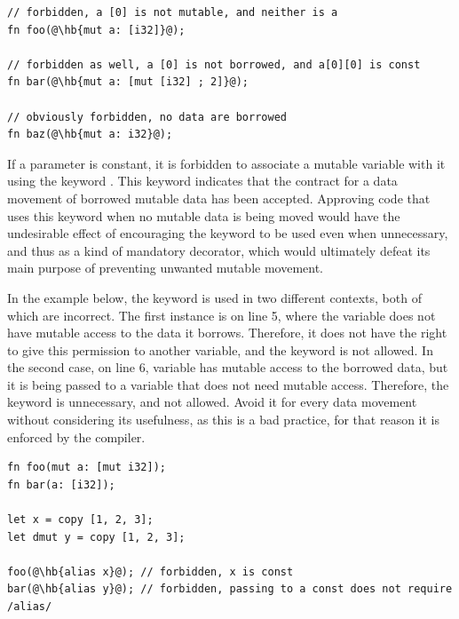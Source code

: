 \begin{lstlisting}[style=coloredverbatimError, escapechar=@]
// forbidden, a [0] is not mutable, and neither is a
fn foo(@\hb{mut a: [i32]}@);

// forbidden as well, a [0] is not borrowed, and a[0][0] is const
fn bar(@\hb{mut a: [mut [i32] ; 2]}@);

// obviously forbidden, no data are borrowed
fn baz(@\hb{mut a: i32}@);
\end{lstlisting}

If a parameter is constant, it is forbidden to associate a mutable variable with
it using the keyword . This keyword indicates that the
contract for a data movement of borrowed mutable data has been accepted.
Approving code that uses this keyword when no mutable data is being moved would
have the undesirable effect of encouraging the keyword to be used even when
unnecessary, and thus as a kind of mandatory decorator, which would ultimately
defeat its main purpose of preventing unwanted mutable movement.

In the example below, the keyword  is used in two different
contexts, both of which are incorrect. The first instance is on line 5, where
the variable  does not have mutable access to the data it borrows.
Therefore, it does not have the right to give this permission to another
variable, and the keyword  is not allowed. In the second case, on
line 6, variable  has mutable access to the borrowed data, but it is
being passed to a variable that does not need mutable access. Therefore, the
keyword is unnecessary, and not allowed. Avoid it for
every data movement without considering its usefulness, as this is a bad
practice, for that reason it is enforced by the compiler.

\begin{lstlisting}[style=coloredverbatimError, escapechar=@]
fn foo(mut a: [mut i32]);
fn bar(a: [i32]);

let x = copy [1, 2, 3];
let dmut y = copy [1, 2, 3];

foo(@\hb{alias x}@); // forbidden, x is const
bar(@\hb{alias y}@); // forbidden, passing to a const does not require /alias/
\end{lstlisting}

\vfill%
\pagebreak
